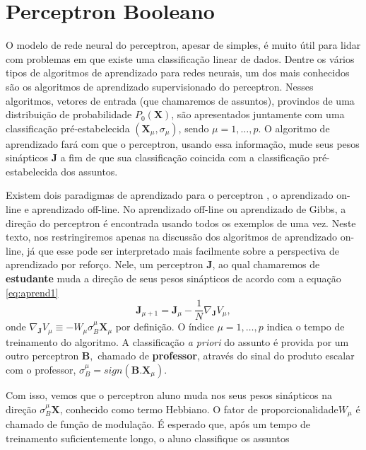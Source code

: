 \section{ Perceptron Booleano }

O modelo de rede neural do perceptron, apesar de simples, é muito útil
para lidar com problemas em que existe uma classificação linear de dados.
Dentre os vários tipos de algoritmos de aprendizado para redes neurais,
um dos mais conhecidos são os algoritmos de aprendizado supervisionado
do perceptron. Nesses algoritmos, vetores de entrada (que chamaremos de
assuntos), provindos de uma distribuição de probabilidade $P_0(\mathbf{X})$,
são apresentados juntamente com uma classificação pré-estabelecida $
(\mathbf{X}_\mu, \sigma_\mu )$, sendo $\mu = 1,\ldots,p$. O algoritmo de
aprendizado fará com que o perceptron, usando essa informação, mude seus
pesos sinápticos $\mathbf{J}$ a fim de que sua classificação coincida
com a classificação pré-estabelecida dos assuntos.

Existem dois paradigmas de aprendizado para o perceptron \cite{Engel2004},
o aprendizado on-line e aprendizado off-line. No aprendizado off-line ou
aprendizado de Gibbs, a direção do perceptron é encontrada usando todos
os exemplos de uma vez. Neste texto, nos restringiremos apenas na discussão
dos algoritmos de aprendizado on-line, já que esse pode ser interpretado mais
facilmente sobre a perspectiva de aprendizado por reforço. Nele, um perceptron
$\mathbf{J}$, ao qual chamaremos de \textbf{estudante} muda a direção
de seus pesos sinápticos de acordo com a equação \eqref{eq:aprend1}
\begin{equation}
  \mathbf{J}_{\mu +1} = \mathbf{J}_\mu - \frac{1}{N}\nabla_\mathbf{J}V_\mu ,
  \label{eq:aprend1}
\end{equation}
onde $ \nabla_\mathbf{J}V_\mu \equiv -\mathit{W}_\mu\sigma_B^\mu\mathbf{X}_\mu$
por definição. O índice $\mu=1,\ldots,p$ indica o tempo de
treinamento do algoritmo. A classificação \textit{a priori} do
assunto é provida por um outro perceptron $\mathbf{B},$ chamado de
\textbf{professor}, através do sinal do produto escalar com o professor,
$\sigma_B^\mu=sign\left(\mathbf{B}.\mathbf{X}_\mu\right)$.

Com isso, vemos que o perceptron aluno muda nos seus pesos sinápticos
na direção $\sigma_B^\mu \mathbf{X}$, conhecido como
termo Hebbiano. O fator de proporcionalidade$ W_\mu$ é chamado de
função de modulação. É esperado que, após um tempo de treinamento
suficientemente longo, o aluno classifique os assuntos

